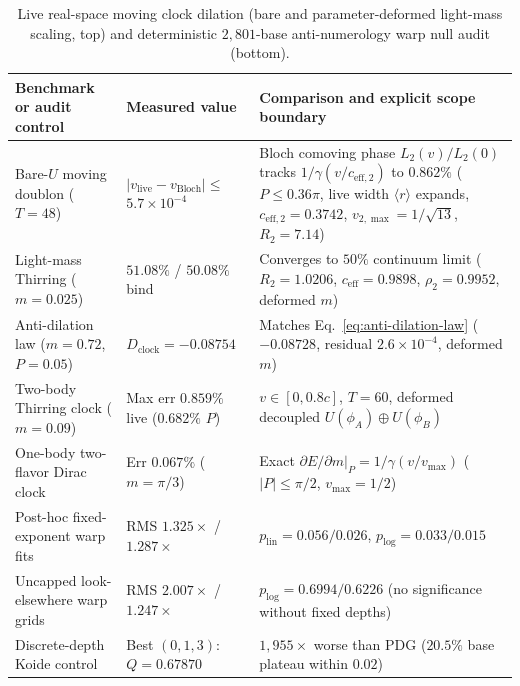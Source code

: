 \begin{table}[tb]
\centering
\caption{Live real-space moving clock dilation (bare and parameter-deformed light-mass scaling, top) and deterministic
$2{,}801$-base anti-numerology warp null audit (bottom).}
\label{tab:clocks-warp}
\footnotesize
\begin{tabularx}{\textwidth}{@{}>{\raggedright\arraybackslash}p{4.05cm}>{\raggedright\arraybackslash}p{3.55cm}>{\raggedright\arraybackslash}X@{}}
\toprule
Benchmark or audit control & Measured value & Comparison and explicit scope boundary \\
\midrule
Bare-$U$ moving doublon ($T = 48$) & $|v_{\mathrm{live}} - v_{\mathrm{Bloch}}| \le$ \mbox{$5.7 \times 10^{-4}$} & Bloch comoving phase $L_2(v)/L_2(0)$ tracks $1/\gamma(v/c_{\mathrm{eff},2})$ to $0.862\%$ ($P \le 0.36\pi$, live width $\langle r \rangle$ expands, $c_{\mathrm{eff},2} = 0.3742$, $v_{2,\max} = 1/\sqrt{13}$, $R_2 = 7.14$) \\
Light-mass Thirring ($m = 0.025$) & $51.08\%$ / $50.08\%$ bind & Converges to $50\%$ continuum limit ($R_2 = 1.0206$, $c_{\mathrm{eff}} = 0.9898$, $\rho_2 = 0.9952$, deformed $m$) \\
Anti-dilation law ($m = 0.72$, $P = 0.05$) & $D_{\mathrm{clock}} = -0.08754$ & Matches Eq.~\eqref{eq:anti-dilation-law} ($-0.08728$, residual $2.6 \times 10^{-4}$, deformed $m$) \\
Two-body Thirring clock ($m = 0.09$) & Max err $\mathbf{0.859\%}$ live ($0.682\%$ $P$) & $v \in [0, 0.8c]$, $T = 60$, deformed decoupled $U(\phi_A) \oplus U(\phi_B)$ \\
One-body two-flavor Dirac clock & Err $\mathbf{0.067\%}$ ($m = \pi/3$) & Exact $\partial E/\partial m|_P = 1/\gamma(v/v_{\max})$ ($|P| \le \pi/2$, $v_{\max} = 1/2$) \\
\midrule
Post-hoc fixed-exponent warp fits & RMS $1.325\times$ / $1.287\times$ & $p_{\mathrm{lin}} = 0.056 / 0.026$, $p_{\mathrm{log}} = 0.033 / 0.015$ \\
Uncapped look-elsewhere warp grids & RMS $2.007\times$ / $1.247\times$ & $p_{\mathrm{log}} = 0.6994 / 0.6226$ (no significance without fixed depths) \\
Discrete-depth Koide control & Best $(0,1,3)$: $Q = 0.67870$ & $1{,}955\times$ worse than PDG ($20.5\%$ base plateau within $0.02$) \\
\bottomrule
\end{tabularx}
\end{table}

